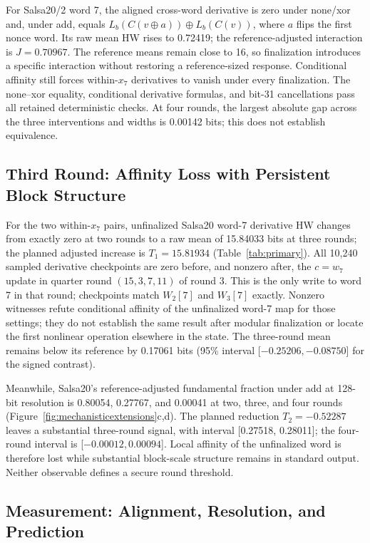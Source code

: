 \documentclass[electronics,article,submit,pdftex,oneauthor]{Definitions/mdpi}
\begin{document}
For Salsa20/2 word 7, the aligned cross-word derivative is zero under none/xor and, under add, equals $L_b(C(v\oplus a))\oplus L_b(C(v))$, where $a$ flips the first nonce word. Its raw mean HW rises to 0.72419; the reference-adjusted interaction is $J=0.70967$. The reference means remain close to 16, so finalization introduces a specific interaction without restoring a reference-sized response. Conditional affinity still forces within-$x_7$ derivatives to vanish under every finalization. The none--xor equality, conditional derivative formulas, and bit-31 cancellations pass all retained deterministic checks. At four rounds, the largest absolute gap across the three interventions and widths is 0.00142 bits; this does not establish equivalence.

\subsection{Third Round: Affinity Loss with Persistent Block Structure}\label{sec:transition}

For the two within-$x_7$ pairs, unfinalized Salsa20 word-7 derivative HW changes from exactly zero at two rounds to a raw mean of 15.84033 bits at three rounds; the planned adjusted increase is $T_1=15.81934$ (Table~\ref{tab:primary}). All 10,240 sampled derivative checkpoints are zero before, and nonzero after, the $c=w_7$ update in quarter round $(15,3,7,11)$ of round 3. This is the only write to word 7 in that round; checkpoints match $W_2[7]$ and $W_3[7]$ exactly. Nonzero witnesses refute conditional affinity of the unfinalized word-7 map for those settings; they do not establish the same result after modular finalization or locate the first nonlinear operation elsewhere in the state. The three-round mean remains below its reference by 0.17061 bits (95\% interval [$-0.25206,-0.08750$] for the signed contrast).

Meanwhile, Salsa20's reference-adjusted fundamental fraction under add at 128-bit resolution is 0.80054, 0.27767, and 0.00041 at two, three, and four rounds (Figure~\ref{fig:mechanisticextensions}c,d). The planned reduction $T_2=-0.52287$ leaves a substantial three-round signal, with interval [0.27518, 0.28011]; the four-round interval is [$-0.00012,0.00094$]. Local affinity of the unfinalized word is therefore lost while substantial block-scale structure remains in standard output. Neither observable defines a secure round threshold.

\subsection{Measurement: Alignment, Resolution, and Prediction}\label{sec:measurementresults}
\end{document}
